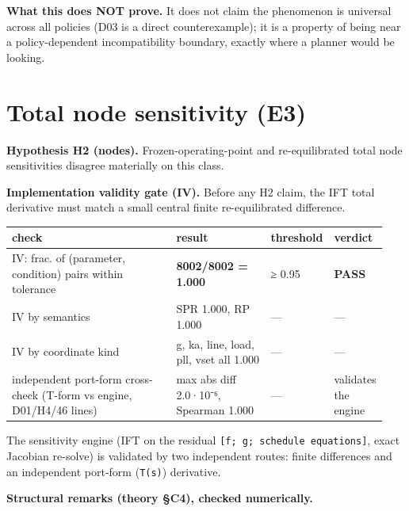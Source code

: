 \documentclass[10pt,a4paper]{article}
\begin{document}
\textbf{What this does NOT prove.} It does not claim the phenomenon is universal across all policies (D03 is a direct counterexample); it is a property of being near a policy-dependent incompatibility boundary, exactly where a planner would be looking.

\section{Total node sensitivity (E3)}
\textbf{Hypothesis H2 (nodes).} Frozen-operating-point and re-equilibrated total node sensitivities disagree materially on this class.

\textbf{Implementation validity gate (IV).} Before any H2 claim, the IFT total derivative must match a small central finite re-equilibrated difference.

{\small
\begin{longtable}{L{0.477\linewidth}L{0.263\linewidth}L{0.062\linewidth}L{0.138\linewidth}}
\toprule
\textbf{check} & \textbf{result} & \textbf{threshold} & \textbf{verdict} \\
\midrule
\endhead
IV: frac. of (parameter, condition) pairs within tolerance & \textbf{8002/8002 = 1.000} & ≥ 0.95 & \textbf{PASS} \\
IV by semantics & SPR 1.000, RP 1.000 & — & — \\
IV by coordinate kind & g, ka, line, load, pll, vset all 1.000 & — & — \\
independent port-form cross-check (T-form vs engine, D01/H4/46 lines) & max abs diff 2.0·10⁻⁶, Spearman 1.000 & — & validates the engine \\
\bottomrule
\end{longtable}}
The sensitivity engine (IFT on the residual \texttt{[f; g; schedule equations]}, exact Jacobian re-solve) is validated by two independent routes: finite differences and an independent port-form (\texttt{T(s)}) derivative.

\textbf{Structural remarks (theory §C4), checked numerically.}
\end{document}
